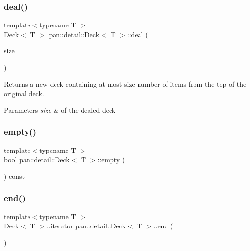 \mbox{\label{classpan_1_1detail_1_1_deck_a2b430f618af32aa3c3d5fff16133ebda}} 
\subsubsection{\texorpdfstring{deal()}{deal()}}
{\footnotesize\ttfamily template$<$typename T $>$ \\
\hyperlink{classpan_1_1detail_1_1_deck}{Deck}$<$ T $>$ \hyperlink{classpan_1_1detail_1_1_deck}{pan\+::detail\+::\+Deck}$<$ T $>$\+::deal (\begin{DoxyParamCaption}\item[{std\+::size\+\_\+t}]{size }\end{DoxyParamCaption})}

Returns a new deck containing at most size number of items from the top of the original deck. 
\begin{DoxyParams}{Parameters}
{\em size} & of the dealed deck \\
\hline
\end{DoxyParams}
\mbox{\label{classpan_1_1detail_1_1_deck_a23b456cde20b1a67c894cff73a4d67ee}} 
\subsubsection{\texorpdfstring{empty()}{empty()}}
{\footnotesize\ttfamily template$<$typename T $>$ \\
bool \hyperlink{classpan_1_1detail_1_1_deck}{pan\+::detail\+::\+Deck}$<$ T $>$\+::empty (\begin{DoxyParamCaption}{ }\end{DoxyParamCaption}) const\hspace{0.3cm}{\ttfamily [inline]}}

\mbox{\label{classpan_1_1detail_1_1_deck_a05820009bdfba814a1a2bc56bce9cbb8}} 
\subsubsection{\texorpdfstring{end()}{end()}\hspace{0.1cm}{\footnotesize\ttfamily [1/2]}}
{\footnotesize\ttfamily template$<$typename T $>$ \\
\hyperlink{classpan_1_1detail_1_1_deck}{Deck}$<$ T $>$\+::\hyperlink{classpan_1_1detail_1_1_deck_a8b4adeae73d035d2bbe3fdfcb65ed1b1}{iterator} \hyperlink{classpan_1_1detail_1_1_deck}{pan\+::detail\+::\+Deck}$<$ T $>$\+::end (\begin{DoxyParamCaption}{ }\end{DoxyParamCaption})\hspace{0.3cm}{\ttfamily [inline]}}

